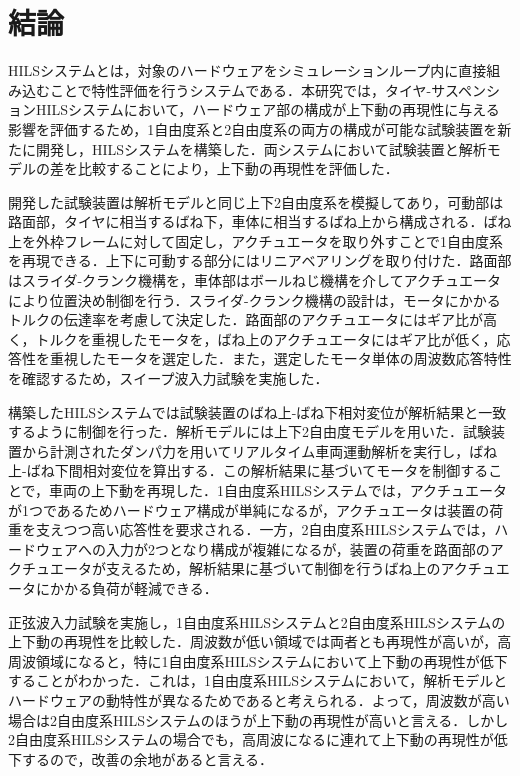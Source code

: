 \documentclass[a4paper,12pt]{article_vdlab_sotsuron}
\begin{document}
\section{結論}
HILSシステムとは，対象のハードウェアをシミュレーションループ内に直接組み込むことで特性評価を行うシステムである．本研究では，タイヤ-サスペンションHILSシステムにおいて，ハードウェア部の構成が上下動の再現性に与える影響を評価するため，1自由度系と2自由度系の両方の構成が可能な試験装置を新たに開発し，HILSシステムを構築した．両システムにおいて試験装置と解析モデルの差を比較することにより，上下動の再現性を評価した．\par
開発した試験装置は解析モデルと同じ上下2自由度系を模擬してあり，可動部は路面部，タイヤに相当するばね下，車体に相当するばね上から構成される．ばね上を外枠フレームに対して固定し，アクチュエータを取り外すことで1自由度系を再現できる．上下に可動する部分にはリニアベアリングを取り付けた．路面部はスライダ-クランク機構を，車体部はボールねじ機構を介してアクチュエータにより位置決め制御を行う．スライダ-クランク機構の設計は，モータにかかるトルクの伝達率を考慮して決定した．路面部のアクチュエータにはギア比が高く，トルクを重視したモータを，ばね上のアクチュエータにはギア比が低く，応答性を重視したモータを選定した．また，選定したモータ単体の周波数応答特性を確認するため，スイープ波入力試験を実施した．\par
構築したHILSシステムでは試験装置のばね上-ばね下相対変位が解析結果と一致するように制御を行った．解析モデルには上下2自由度モデルを用いた．試験装置から計測されたダンパ力を用いてリアルタイム車両運動解析を実行し，ばね上-ばね下間相対変位を算出する．この解析結果に基づいてモータを制御することで，車両の上下動を再現した．1自由度系HILSシステムでは，アクチュエータが1つであるためハードウェア構成が単純になるが，アクチュエータは装置の荷重を支えつつ高い応答性を要求される．一方，2自由度系HILSシステムでは，ハードウェアへの入力が2つとなり構成が複雑になるが，装置の荷重を路面部のアクチュエータが支えるため，解析結果に基づいて制御を行うばね上のアクチュエータにかかる負荷が軽減できる．\par
正弦波入力試験を実施し，1自由度系HILSシステムと2自由度系HILSシステムの上下動の再現性を比較した．周波数が低い領域では両者とも再現性が高いが，高周波領域になると，特に1自由度系HILSシステムにおいて上下動の再現性が低下することがわかった．これは，1自由度系HILSシステムにおいて，解析モデルとハードウェアの動特性が異なるためであると考えられる．よって，周波数が高い場合は2自由度系HILSシステムのほうが上下動の再現性が高いと言える．しかし2自由度系HILSシステムの場合でも，高周波になるに連れて上下動の再現性が低下するので，改善の余地があると言える．
\end{document}

